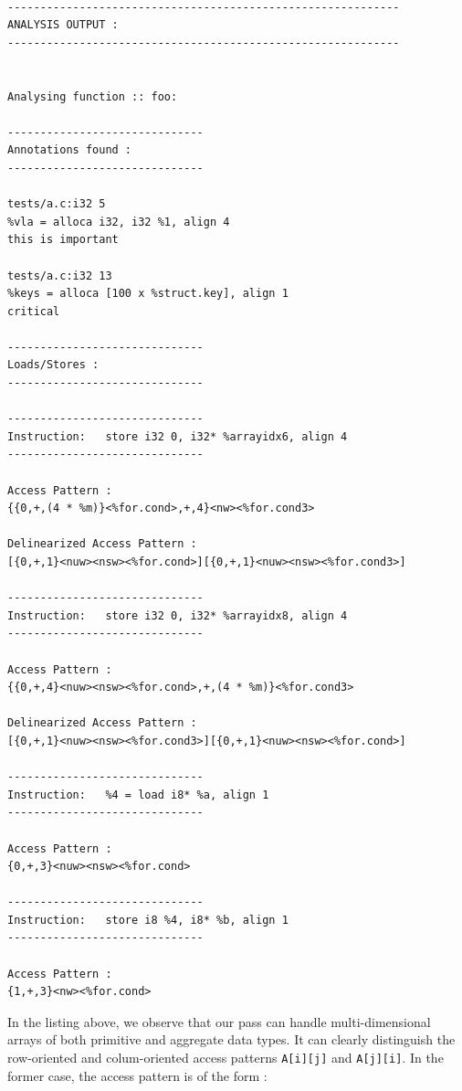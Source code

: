 \documentclass[letterpaper]{article}
\begin{document}
\begin{lstlisting}[caption={Analysis Output},label={lst:output}]

------------------------------------------------------------
ANALYSIS OUTPUT :
------------------------------------------------------------


Analysing function :: foo:

------------------------------
Annotations found :
------------------------------

tests/a.c:i32 5           
%vla = alloca i32, i32 %1, align 4    
this is important

tests/a.c:i32 13          
%keys = alloca [100 x %struct.key], align 1   
critical

------------------------------
Loads/Stores :
------------------------------

------------------------------
Instruction:   store i32 0, i32* %arrayidx6, align 4
------------------------------

Access Pattern :
{{0,+,(4 * %m)}<%for.cond>,+,4}<nw><%for.cond3>

Delinearized Access Pattern :
[{0,+,1}<nuw><nsw><%for.cond>][{0,+,1}<nuw><nsw><%for.cond3>]

------------------------------
Instruction:   store i32 0, i32* %arrayidx8, align 4
------------------------------

Access Pattern :
{{0,+,4}<nuw><nsw><%for.cond>,+,(4 * %m)}<%for.cond3>

Delinearized Access Pattern :
[{0,+,1}<nuw><nsw><%for.cond3>][{0,+,1}<nuw><nsw><%for.cond>]

------------------------------
Instruction:   %4 = load i8* %a, align 1
------------------------------

Access Pattern :
{0,+,3}<nuw><nsw><%for.cond>

------------------------------
Instruction:   store i8 %4, i8* %b, align 1
------------------------------

Access Pattern :
{1,+,3}<nw><%for.cond>

\end{lstlisting}

In the listing above, we observe that our pass can handle multi-dimensional
arrays of both primitive and aggregate data types. It can clearly distinguish
the row-oriented and colum-oriented access patterns \texttt{A[i][j]} and 
\texttt{A[j][i]}. In the former case, the access pattern is of the form :\\
  
\end{document}
